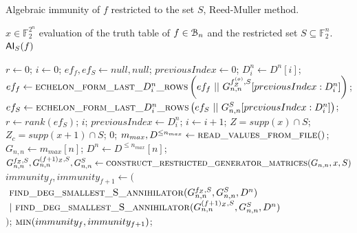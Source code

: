 \documentclass[11pt]{llncs}
\begin{document}
\begin{algorithm}[H]
\small
	\caption{Algebraic immunity of $f$ restricted to the set $S$, Reed-Muller method.}\label{alg:RMApproach}
	\begin{algorithmic}[1]
		\Require $x\in \mathbb{F}_2^{2^n}$ evaluation of the truth table of $f\in \mathcal{B}_{n}$ and the restricted set $S\subseteq \mathbb{F}_2^n$.
		\Ensure $\mathsf{AI}_S(f)$
		
		\State $r \gets 0$;
		\State $i \gets 0$;
		\State $ef_f, ef_S \gets null, null$;
		\State $previousIndex \gets 0$;
		\State $D_i^n \gets D^n[i]$;
		\State $ef_f\gets \mbox{\textsc{echelon\_form\_last\_}}D_i^n\mbox{\textsc{\_rows}}\left(ef_f\ ||\  G_{n,n}^{f_Z^{(o)},S}[previousIndex:D_i^n]\right)$\footnotemark;
		\State $ef_S \gets \mbox{\textsc{echelon\_form\_last\_}}D_i^n\mbox{\textsc{\_rows}}\left(ef_S\ ||\ G_{n,n}^S[previousIndex:D_i^n]\right)$;
		\State $r \gets rank\left(ef_S\right)$;
		\State
		\Return $i$;
		\EndIf
		\State $previousIndex \gets D_i^n$;
		\State $i \gets i+1$;
		\EndWhile
		\EndFunction
        \State
        \State $Z = supp(x)\cap S$;
        \State $Z_c = supp(x+1) \cap S$;
		\Return $0$;
		\EndIf
		\State $m_{max}, D^{\leq n_{max}}\gets \mbox{\textsc{read\_values\_from\_file}}()$;
		\State $G_{n,n}\gets m_{max}[n]$;
		\State $D^n \gets D^{\leq n_{max}}[n]$;
        \State $G_{n,n}^{f_Z,S}, G_{n,n}^{(f+ 1)_Z,S}, G_{n,n}^S \gets \textsc{construct\_restricted\_generator\_matrices}(G_{n,n},x,S)$\footnotemark\;
		\State $immunity_f, immunity_{f+1} \leftarrow ($\\
		$\ \mbox{\textsc{find\_deg\_smallest\_S\_annihilator}}(G_{n,n}^{f_Z,S}, G_{n,n}^S,D^{n})$\\
		$\ |\ \mbox{\textsc{find\_deg\_smallest\_S\_annihilator}}(G_{n,n}^{(f+ 1)_Z,S}, G_{n,n}^S, D^{n})$\\
		$)$;
		\State \Return $\mbox{\textsc{min}}(immunity_f, immunity_{f+1})$\footnotemark;
	\end{algorithmic}
\end{algorithm}
\end{document}
